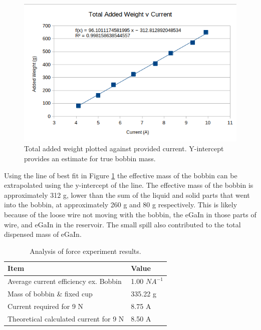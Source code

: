 \documentclass[a4paper,12pt]{article}
\begin{document}
\begin{figure}[h!]
    \centering
    \includegraphics[width=\textwidth]{resultforcevcurrent.png}
    \caption{Total added weight plotted against provided current. Y-intercept provides an estimate for true bobbin mass.}
    \label{fg:forceplot}
\end{figure}

Using the line of best fit in Figure \ref{fg:forceplot} the effective mass of the bobbin can be extrapolated using the y-intercept of the line. The effective mass of the bobbin is approximately 312 g, lower than the sum of the liquid and solid parts that went into the bobbin, at approximately 260 g and 80 g respectively. This is likely because of the loose wire not moving with the bobbin, the eGaIn in those parts of wire, and eGaIn in the reservoir. The small spill also contributed to the total dispensed mass of eGaIn.

\begin{table}[h!]
    \centering
    \caption{Analysis of force experiment results.}
    \label{tb:fullresults3}
    \begin{tabular}{ L | l }
        \hline
        Item & Value \\
        \hline\hline
        Average current efficiency ex. Bobbin & 1.00 $NA^{-1}$ \\
        \hline
        Mass of bobbin \& fixed cup & 335.22 g \\
        \hline
        Current required for 9 N & 8.75 A \\
        \hline
        Theoretical calculated current for 9 N & 8.50 A \\
        \hline
    \end{tabular}
\end{table}
\end{document}
